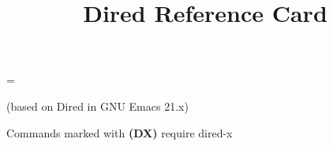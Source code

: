\def\key#1#2{\leavevmode\hbox to \hsize{\vtop
  {\hsize=.75\hsize\rightskip=1em
  \hskip\keyindent\relax#1}\kbd{#2}\hfil}}

\newbox\metaxbox
\setbox\metaxbox\hbox{}
\newdimen\metaxwidth
\metaxwidth=\wd\metaxbox

\def\metax#1#2{\leavevmode\hbox to \hsize{\hbox to .75\hsize
  {\hskip\keyindent\relax#1\hfil}%
  \hskip -\metaxwidth minus 1fil
  \kbd{#2}\hfil}}

\def\threecol#1#2#3{\hskip\keyindent\relax#1\hfil&\kbd{#2}\hfil\quad
  &\kbd{#3}\hfil\quad\cr}

\def\dx{{\bf (DX)}}



\title{Dired Reference Card}

\centerline{(based on Dired in GNU Emacs 21.x)}
\centerline{Commands marked with \dx{} require dired-x}




